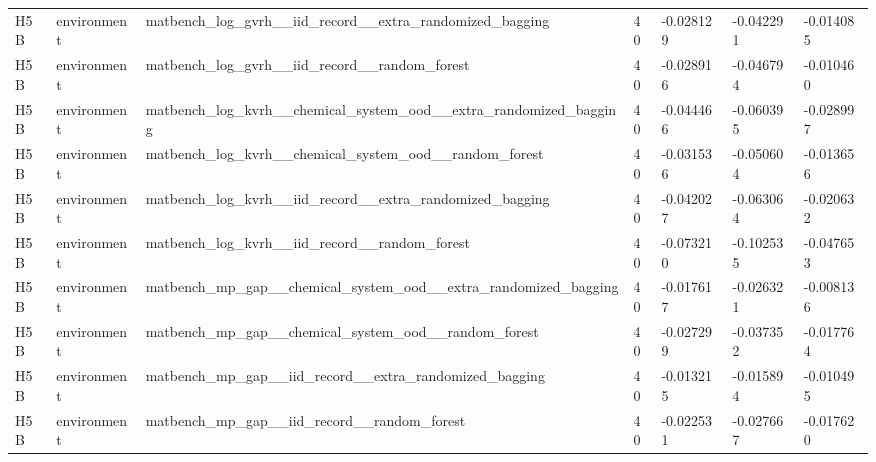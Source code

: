 \documentclass[10pt]{article}
\begin{document}
\begin{landscape}
\begin{longtable}{L{.35in}L{.6in}L{3.55in}L{.4in}L{.88in}L{.88in}L{.88in}}
H5B & environment & matbench\_\allowbreak{}log\_\allowbreak{}gvrh\_\allowbreak{}\_\allowbreak{}iid\_\allowbreak{}record\_\allowbreak{}\_\allowbreak{}extra\_\allowbreak{}randomized\_\allowbreak{}bagging & 40 & -0.028129 & -0.042291 & -0.014085\\
H5B & environment & matbench\_\allowbreak{}log\_\allowbreak{}gvrh\_\allowbreak{}\_\allowbreak{}iid\_\allowbreak{}record\_\allowbreak{}\_\allowbreak{}random\_\allowbreak{}forest & 40 & -0.028916 & -0.046794 & -0.010460\\
H5B & environment & matbench\_\allowbreak{}log\_\allowbreak{}kvrh\_\allowbreak{}\_\allowbreak{}chemical\_\allowbreak{}system\_\allowbreak{}ood\_\allowbreak{}\_\allowbreak{}extra\_\allowbreak{}randomized\_\allowbreak{}bagging & 40 & -0.044466 & -0.060395 & -0.028997\\
H5B & environment & matbench\_\allowbreak{}log\_\allowbreak{}kvrh\_\allowbreak{}\_\allowbreak{}chemical\_\allowbreak{}system\_\allowbreak{}ood\_\allowbreak{}\_\allowbreak{}random\_\allowbreak{}forest & 40 & -0.031536 & -0.050604 & -0.013656\\
H5B & environment & matbench\_\allowbreak{}log\_\allowbreak{}kvrh\_\allowbreak{}\_\allowbreak{}iid\_\allowbreak{}record\_\allowbreak{}\_\allowbreak{}extra\_\allowbreak{}randomized\_\allowbreak{}bagging & 40 & -0.042027 & -0.063064 & -0.020632\\
H5B & environment & matbench\_\allowbreak{}log\_\allowbreak{}kvrh\_\allowbreak{}\_\allowbreak{}iid\_\allowbreak{}record\_\allowbreak{}\_\allowbreak{}random\_\allowbreak{}forest & 40 & -0.073210 & -0.102535 & -0.047653\\
H5B & environment & matbench\_\allowbreak{}mp\_\allowbreak{}gap\_\allowbreak{}\_\allowbreak{}chemical\_\allowbreak{}system\_\allowbreak{}ood\_\allowbreak{}\_\allowbreak{}extra\_\allowbreak{}randomized\_\allowbreak{}bagging & 40 & -0.017617 & -0.026321 & -0.008136\\
H5B & environment & matbench\_\allowbreak{}mp\_\allowbreak{}gap\_\allowbreak{}\_\allowbreak{}chemical\_\allowbreak{}system\_\allowbreak{}ood\_\allowbreak{}\_\allowbreak{}random\_\allowbreak{}forest & 40 & -0.027299 & -0.037352 & -0.017764\\
H5B & environment & matbench\_\allowbreak{}mp\_\allowbreak{}gap\_\allowbreak{}\_\allowbreak{}iid\_\allowbreak{}record\_\allowbreak{}\_\allowbreak{}extra\_\allowbreak{}randomized\_\allowbreak{}bagging & 40 & -0.013215 & -0.015894 & -0.010495\\
H5B & environment & matbench\_\allowbreak{}mp\_\allowbreak{}gap\_\allowbreak{}\_\allowbreak{}iid\_\allowbreak{}record\_\allowbreak{}\_\allowbreak{}random\_\allowbreak{}forest & 40 & -0.022531 & -0.027667 & -0.017620\\

\end{longtable}
\end{landscape}
\end{document}
